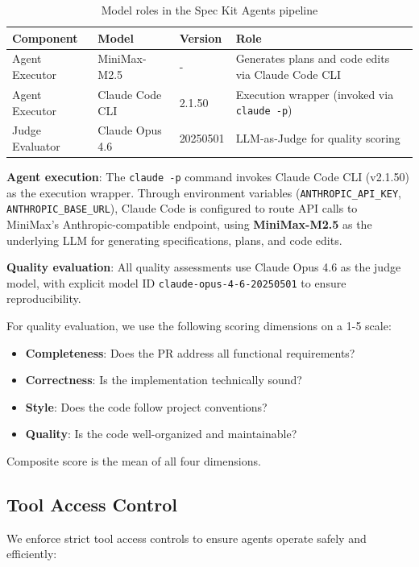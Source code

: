 \documentclass[sigconf,anonymous,review]{acmart}
\begin{document}
\begin{table}[ht]
  \centering
  \caption{Model roles in the Spec Kit Agents pipeline}
  \label{tab:model-roles}
  \begin{tabular}{lllp{5cm}}
    \hline
    \textbf{Component} & \textbf{Model} & \textbf{Version} & \textbf{Role} \\
    \hline
    Agent Executor & MiniMax-M2.5 & - & Generates plans and code edits via Claude Code CLI \\
    Agent Executor & Claude Code CLI & 2.1.50 & Execution wrapper (invoked via \texttt{claude -p}) \\
    Judge Evaluator & Claude Opus 4.6 & 20250501 & LLM-as-Judge for quality scoring \\
    \hline
  \end{tabular}
\end{table}

\textbf{Agent execution}: The \texttt{claude -p} command invokes Claude Code CLI (v2.1.50) as the execution wrapper. Through environment variables (\texttt{ANTHROPIC\_API\_KEY}, \texttt{ANTHROPIC\_BASE\_URL}), Claude Code is configured to route API calls to MiniMax's Anthropic-compatible endpoint, using \textbf{MiniMax-M2.5} as the underlying LLM for generating specifications, plans, and code edits.

\textbf{Quality evaluation}: All quality assessments use Claude Opus 4.6 as the judge model, with explicit model ID \texttt{claude-opus-4-6-20250501} to ensure reproducibility.

For quality evaluation, we use the following scoring dimensions on a 1-5 scale:
\begin{itemize}
  \item \textbf{Completeness}: Does the PR address all functional requirements?
  \item \textbf{Correctness}: Is the implementation technically sound?
  \item \textbf{Style}: Does the code follow project conventions?
  \item \textbf{Quality}: Is the code well-organized and maintainable?
\end{itemize}

Composite score is the mean of all four dimensions.

\subsection{Tool Access Control}

We enforce strict tool access controls to ensure agents operate safely and efficiently:
\end{document}
